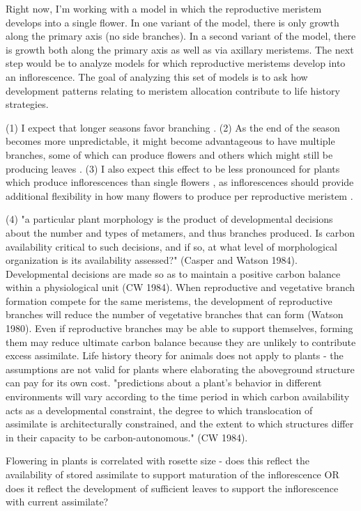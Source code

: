 \documentclass[12pt, oneside]{article}   	%
\begin{document}
Right now, I'm working with a model in which the reproductive meristem develops into a single flower. In one variant of the model, there is only growth along the primary axis (no side branches). In a second variant of the model, there is growth both along the primary axis as well as via axillary meristems. The next step would be to analyze models for which reproductive meristems develop into an inflorescence. The goal of analyzing this set of models is to ask how development patterns relating to meristem allocation contribute to life history strategies. 

(1) I expect that longer seasons favor branching \cite{Geber1990}. (2) As the end of the season becomes more unpredictable, it might become advantageous to have multiple branches, some of which can produce flowers and others which might still be producing leaves \cite{Geber1990}. (3) I also expect this effect to be less pronounced for plants which produce inflorescences than single flowers \cite{bonser2006}, as inflorescences should provide additional flexibility in how many flowers to produce per reproductive meristem \cite{bonser2006,salomonson1994}.

(4) "a particular plant morphology is the product of developmental decisions about the number and types of metamers, and thus branches produced. Is carbon availability critical to such decisions, and if so, at what level of morphological organization is its availability assessed?" (Casper and Watson 1984). Developmental decisions are made so as to maintain a positive carbon balance within a physiological  unit (CW 1984). When reproductive and vegetative branch formation compete for the same meristems, the development of reproductive branches will reduce the number of vegetative branches that can form (Watson 1980). Even if reproductive branches may be able to support themselves, forming them may reduce ultimate carbon balance because they are unlikely to contribute excess assimilate. Life history theory for animals does not apply to plants - the assumptions are not valid for plants where elaborating the aboveground structure can pay for its own cost. "predictions about a plant's behavior in different environments will vary according to the time period in which carbon availability acts as a developmental constraint, the degree to which translocation of assimilate is architecturally constrained, and the extent to which structures differ in their capacity to be carbon-autonomous." (CW 1984).

Flowering in plants is correlated with rosette size - does this reflect the availability of stored assimilate to support maturation of the inflorescence OR does it reflect the development of sufficient leaves to support the inflorescence with current assimilate?
\end{document}
